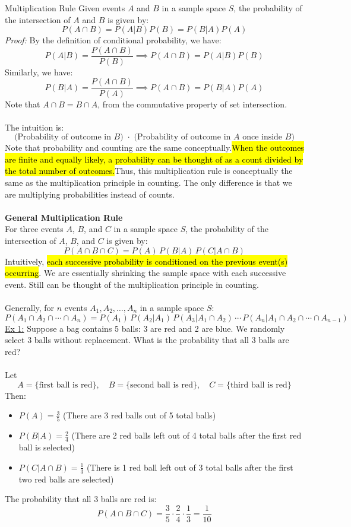 ﻿\documentclass[12pt]{article}
\begin{document}
\begin{theorem}{Multiplication Rule}
    Given events $A$ and $B$ in a sample space $S$, the probability of the intersection of $A$ and $B$ is given by:
    \[P(A \cap B) = P(A|B)P(B) = P(B|A)P(A)\]
    \textit{Proof:} By the definition of conditional probability, we have:
    \[P(A|B) = \frac{P(A \cap B)}{P(B)} \implies P(A \cap B) = P(A|B)P(B)\]
Similarly, we have:
    \[P(B|A) = \frac{P(A \cap B)}{P(A)} \implies P(A \cap B) = P(B|A)P(A)\]
Note that $A \cap B = B \cap A$, from the commutative property of set intersection.\\\\
The intuition is:
\[\text{(Probability of outcome in $B$) $\cdot$ (Probability of outcome in $A$ once inside $B$)}\]
Note that probability and counting are the same conceptually.\hl{When the outcomes are finite and equally likely, a probability can be thought of as a count divided by the total number of outcomes.}Thus, this multiplication rule is conceptually the same as the multiplication principle in counting. The only difference is that we are multiplying probabilities instead of counts.\\\\
\textbf{General Multiplication Rule}\\
For three events $A$, $B$, and $C$ in a sample space $S$, the probability of the intersection of $A$, $B$, and $C$ is given by:
\[P(A \cap B \cap C) = P(A)\,P(B|A)\,P(C|A \cap B)\]
Intuitively, \hl{each successive probability is conditioned on the previous event(s) occurring}. We are essentially shrinking the sample space with each successive event. Still can be thought of the multiplication principle in counting.\\\\
Generally, for $n$ events $A_1, A_2, \ldots, A_n$ in a sample space $S$:
\[P(A_1 \cap A_2 \cap \cdots \cap A_n) = P(A_1)\,P(A_2|A_1)\,P(A_3|A_1 \cap A_2)\,\cdots\,P(A_n|A_1 \cap A_2 \cap \cdots \cap A_{n-1})\]
\underline{Ex 1:} Suppose a bag contains 5 balls: 3 are red and 2 are blue. We randomly select 3 balls without replacement. What is the probability that all 3 balls are red?\\\\
Let
\[A = \{\text{first ball is red}\}, \quad B = \{\text{second ball is red}\}, \quad C = \{\text{third ball is red}\}\]
Then:
\begin{itemize}
    \item $P(A) = \frac{3}{5}$ (There are 3 red balls out of 5 total balls)
    \item $P(B|A) = \frac{2}{4}$ (There are 2 red balls left out of 4 total balls after the first red ball is selected)
    \item $P(C|A \cap B) = \frac{1}{3}$ (There is 1 red ball left out of 3 total balls after the first two red balls are selected)
\end{itemize}
The probability that all 3 balls are red is:
\[P(A \cap B \cap C) = \frac{3}{5} \cdot \frac{2}{4} \cdot \frac{1}{3} =  \frac{1}{10}\]
\end{theorem}
\end{document}

